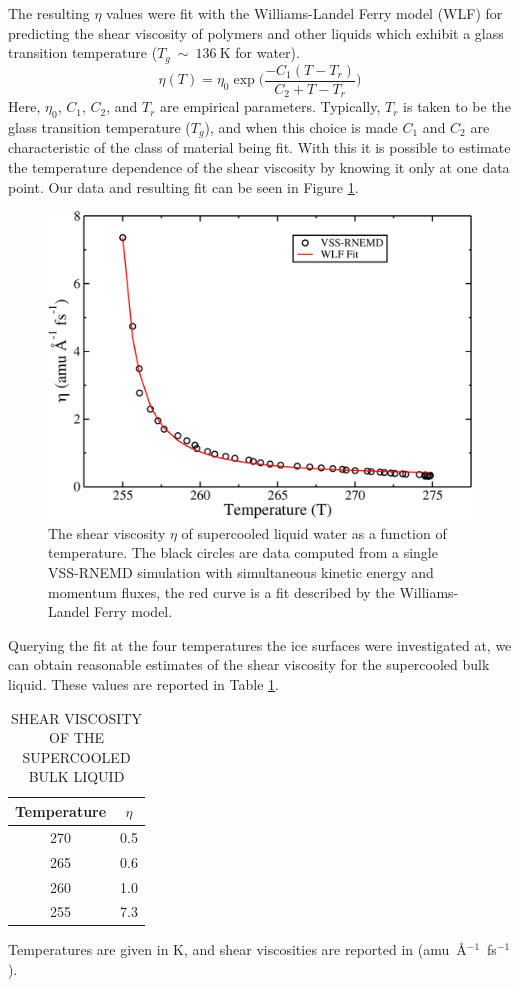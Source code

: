 The resulting $\eta$ values were fit with the Williams-Landel Ferry model (WLF)
for predicting the shear viscosity of polymers and other liquids which
exhibit a glass transition temperature ($T_g~\sim~136~\mathrm{K}$ for
water). 
\begin{equation}\label{eq:WLF}
\eta (T) = \eta_0 \exp \Bigg({\frac{-C_1 (T-T_r)}{C_2 + T - T_r}}\Bigg)
\end{equation}
Here, $\eta_0$, $C_1$, $C_2$, and $T_r$ are empirical
parameters. Typically, $T_r$ is taken to be the glass transition
temperature ($T_g$), and when this choice is made $C_1$ and $C_2$ are
characteristic of the class of material being
fit. With this it is possible to estimate the temperature dependence
of the shear viscosity by knowing it only at one data point. Our data
and resulting fit can be seen in Figure \ref{fig:etaT}.
\begin{figure}
\includegraphics[width=\linewidth]{Figures/etaT}
\caption{\label{fig:etaT} The shear viscosity $\eta$ of supercooled
  liquid water as a function of temperature. The black circles are
  data computed from a single VSS-RNEMD simulation with simultaneous
  kinetic energy and momentum fluxes, the red curve is a fit described
  by the Williams-Landel Ferry model.}
\end{figure} 
Querying the fit at the four temperatures the ice surfaces were
investigated at, we can obtain reasonable estimates of the shear
viscosity for the supercooled bulk liquid. These values are reported
in Table \ref{tab:bulkVisco}.
   

\begin{table}[h] \centering \caption{SHEAR VISCOSITY OF THE
    SUPERCOOLED BULK LIQUID\label{tab:bulkVisco}}
\begin{tabular}{cc}
\hline
\hline
 Temperature & $\eta$ \\
\hline
270 & 0.5 \\
265 & 0.6 \\
260 & 1.0  \\
255 & 7.3 \\
\hline
\hline
\end{tabular}
\begin{flushleft}
  Temperatures are given in K, and shear viscosities are reported in
  (amu~\AA$^{-1}$~fs$^{-1}$).
\end{flushleft}
\end{table}


